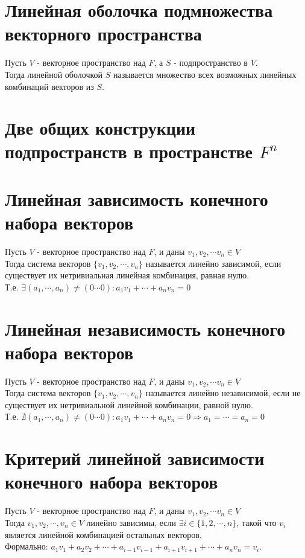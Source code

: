 \documentclass[a4paper,11pt]{report}
\begin{document}
\section{Линейная оболочка подмножества векторного пространства}
Пусть $V$ - векторное пространство над $F$, а $S$ - подпространство в $V$.\\
Тогда линейной оболочкой $S$ называется множество всех возможных линейных комбинаций
векторов из $S$.
\section{Две общих конструкции подпространств в пространстве $F^n$}
\section{Линейная зависимость конечного набора векторов}
Пусть $V$ - векторное пространство над $F$, и даны $v_1, v_2, \cdots v_n \in V$\\
Тогда система векторов $\{ v_1, v_2, \cdots, v_n \}$ называется линейно зависимой,
если существует их нетривиальная линейная комбинация, равная нулю.\\
Т.е. $\exists (a_1, \cdots, a_n) \neq (0 \cdots 0): a_1v_1 + \cdots + a_nv_n = 0$\\
\section{Линейная независимость конечного набора векторов}
Пусть $V$ - векторное пространство над $F$, и даны $v_1, v_2, \cdots v_n \in V$\\
Тогда система векторов $\{ v_1, v_2, \cdots, v_n \}$ называется линейно независимой,
если не существует их нетривиальной линейной комбинации, равной нулю.\\
Т.е. $\nexists (a_1, \cdots, a_n) \neq (0 \cdots 0): a_1v_1 + \cdots + a_nv_n = 0 \Rightarrow a_1 = \cdots = a_n = 0$\\
\section{Критерий линейной зависимости конечного набора векторов}
Пусть $V$ - векторное пространство над $F$, и даны $v_1, v_2, \cdots v_n \in V$\\
Тогда $v_1, v_2, \cdots, v_n \in V$ линейно зависимы, если $\exists i \in \{1, 2, \cdots, n\}$, такой что
$v_i$ является линейной комбинацией остальных векторов.\\
Формально: $a_1v_1 + a_2v_2 + \cdots + a_{i-1}v_{i-1} + a_{i+1}v_{i+1} + \cdots + a_nv_n = v_i$.
\end{document}
